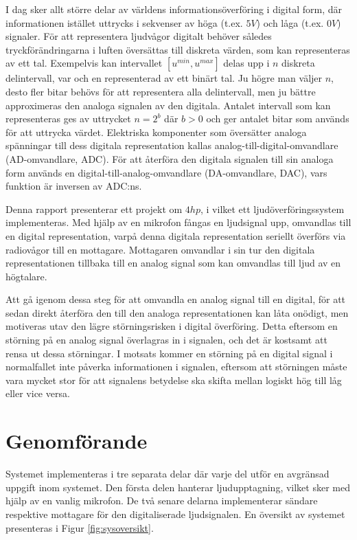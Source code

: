 \documentclass[a4paper,10pt]{article}
\begin{document}
I dag sker allt större delar av världens informationsöverföring i digital form, 
där informationen istället uttrycks i sekvenser av höga (t.ex. $5V$) och låga
(t.ex. $0V$) signaler. För att representera ljudvågor digitalt behöver således 
tryckförändringarna i luften översättas till diskreta värden, som kan 
representeras av ett tal.
Exempelvis kan intervallet $[u^{min}, u^{max}]$ delas upp i $n$ diskreta 
delintervall, var och en representerad av ett binärt tal. Ju högre man väljer
$n$, desto fler bitar behövs för att representera alla delintervall, men ju
bättre approximeras den analoga signalen av den digitala. Antalet intervall som 
kan representeras ges av uttrycket $n = 2^b$ där $b > 0$ och ger antalet bitar 
som används för att uttrycka värdet. Elektriska komponenter som översätter 
analoga spänningar till dess digitala representation kallas 
analog-till-digital-omvandlare (AD-omvandlare, ADC). 
För att återföra den digitala signalen till sin analoga form används en
digital-till-analog-omvandlare (DA-omvandlare, DAC), vars funktion är
inversen av ADC:ns. 

Denna rapport presenterar ett projekt om $4 hp$, i vilket ett 
ljudöverföringssystem implementeras. Med hjälp av en mikrofon fångas en 
ljudsignal upp, omvandlas till en digital representation, varpå denna digitala 
representation seriellt överförs via radiovågor till en mottagare. Mottagaren 
omvandlar i sin tur den digitala representationen tillbaka till en analog signal 
som kan omvandlas till ljud av en högtalare.

Att gå igenom dessa steg för att omvandla en analog signal till en digital, för
att sedan direkt återföra den till den analoga representationen kan låta 
onödigt, men motiveras utav den lägre störningsrisken i digital överföring. 
Detta eftersom en störning på en analog signal överlagras in i signalen, och
det är kostsamt att rensa ut dessa störningar. I motsats kommer en störning på
en digital signal i normalfallet inte påverka informationen i signalen, eftersom
att störningen måste vara mycket stor för att signalens betydelse ska skifta
mellan logiskt hög till låg eller vice versa.


\section{Genomförande}

Systemet implementeras i tre separata delar där varje del utför en avgränsad 
uppgift inom systemet. Den första delen hanterar ljudupptagning, vilket sker med
hjälp av en vanlig mikrofon. De två senare delarna implementerar sändare
respektive mottagare för den digitaliserade ljudsignalen. En översikt av 
systemet presenteras i Figur \ref{fig:sysoversikt}.
\end{document}
